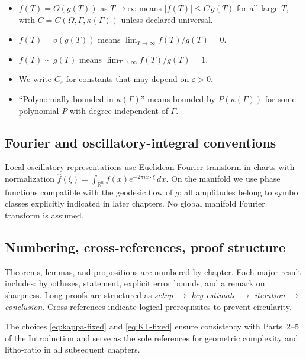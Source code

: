 \begin{itemize}
  \item $f(T)=O(g(T))$ as $T\to\infty$ means $|f(T)|\le C\,g(T)$ for all large $T$,
        with $C=C(\Omega,\Gamma,\kappa(\Gamma))$ unless declared universal.
  \item $f(T)=o(g(T))$ means $\lim_{T\to\infty}f(T)/g(T)=0$.
  \item $f(T)\sim g(T)$ means $\lim_{T\to\infty}f(T)/g(T)=1$.
  \item We write $C_\varepsilon$ for constants that may depend on $\varepsilon>0$.
  \item ``Polynomially bounded in $\kappa(\Gamma)$'' means bounded by
        $P(\kappa(\Gamma))$ for some polynomial $P$ with degree independent of $\Gamma$.
\end{itemize}

\subsection{Fourier and oscillatory-integral conventions}

Local oscillatory representations use Euclidean Fourier transform in charts with
normalization $\widehat{f}(\xi)=\int_{\mathbb{R}^n} f(x)e^{-2\pi i x\cdot\xi}\,dx$.
On the manifold we use phase functions compatible with the geodesic flow of $g$;
all amplitudes belong to symbol classes explicitly indicated in later chapters.
No global manifold Fourier transform is assumed.

\subsection{Numbering, cross-references, proof structure}

Theorems, lemmas, and propositions are numbered by chapter. Each major result
includes: hypotheses, statement, explicit error bounds, and a remark on sharpness.
Long proofs are structured as \emph{setup} $\to$ \emph{key estimate}
$\to$ \emph{iteration} $\to$ \emph{conclusion}. Cross-references indicate
logical prerequisites to prevent circularity.

\medskip
The choices \eqref{eq:kappa-fixed} and \eqref{eq:KL-fixed} ensure consistency
with Parts~2–5 of the Introduction and serve as the sole references for
geometric complexity and litho-ratio in all subsequent chapters.


